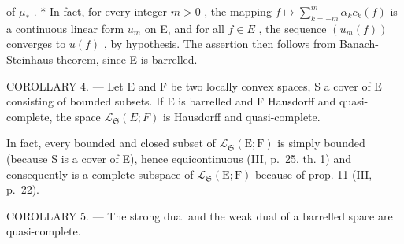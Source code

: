 of \(\mu_{*}\) . * In fact, for every integer \(m > 0\) , the mapping \(f \mapsto \sum_{k = -m}^{m} \alpha_k c_k(f)\) is a continuous linear form \(u_{m}\) on E, and for all \(f \in E\) , the sequence \((u_{m}(f))\) converges to \(u(f)\) , by hypothesis. The assertion then follows from Banach-Steinhaus theorem, since E is barrelled.

COROLLARY 4. --- Let E and F be two locally convex spaces, S a cover of E consisting of bounded subsets. If E is barrelled and F Hausdorff and quasi-complete, the space \(\mathcal{L}_{\mathfrak{S}}(E;F)\) is Hausdorff and quasi-complete.

In fact, every bounded and closed subset of \(\mathcal{L}_{\mathfrak{S}}(\mathrm{E};\mathrm{F})\) is simply bounded (because S is a cover of E), hence equicontinuous (III, p.~25, th. 1) and consequently is a complete subspace of \(\mathcal{L}_{\mathfrak{S}}(\mathrm{E};\mathrm{F})\) because of prop. 11 (III, p.~22).

COROLLARY 5. --- The strong dual and the weak dual of a barrelled space are quasi-complete.

